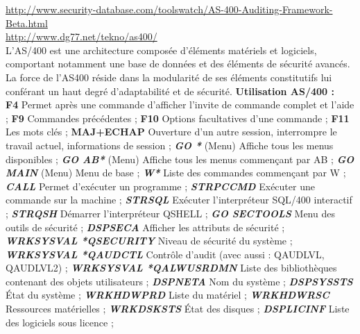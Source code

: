 \documentclass[a4paper,11pt]{article}				    %
\begin{document}
{
\url{http://www.security-database.com/toolswatch/AS-400-Auditing-Framework-Beta.html}\\
\url{http://www.dg77.net/tekno/as400/}
}
{
\\L'AS/400 est une architecture compos\'ee d'\'el\'ements mat\'eriels et logiciels, comportant notamment une base de donn\'ees et des \'el\'ements de s\'ecurit\'e avanc\'es. La force de l'AS400 r\'eside dans la modularit\'e de ses \'el\'ements constitutifs lui conf\'erant un haut degr\'e d'adaptabilit\'e et de s\'ecurit\'e.
}
{
\textbf{Utilisation AS/400 :}\\
{
\small
	\textbf{F4} Permet apr\`es une commande d'afficher l'invite de commande complet et l'aide ;\vskip-0.1cm
	\textbf{F9} Commandes pr\'ec\'edentes ;\vskip-0.1cm
	 \textbf{F10} Options facultatives d'une commande ;\vskip-0.1cm
	 \textbf{F11} Les mots cl\'es ;\vskip-0.1cm
	 \textbf{MAJ+ECHAP} Ouverture d'un autre session, interrompre le travail actuel, informations de session ;\vskip-0.1cm
	 \textbf{\sl \color{blue}GO *} (Menu) Affiche tous les menus disponibles ;\vskip-0.1cm
	 \textbf{\sl \color{blue}GO AB*} (Menu) Affiche tous les menus commen\c cant par AB ;\vskip-0.1cm
	 \textbf{\sl \color{blue}GO MAIN} (Menu) Menu de base ;\vskip-0.1cm
	 \textbf{\sl \color{blue}W*} Liste des commandes commen\c cant par W ;\vskip-0.1cm
	 \textbf{\sl \color{blue}CALL} Permet d'ex\'ecuter un programme ;\vskip-0.1cm
	 \textbf{\sl \color{blue}STRPCCMD} Ex\'ecuter une commande sur la machine ;\vskip-0.1cm
	 \textbf{\sl \color{blue}STRSQL} Ex\'ecuter l'interpr\'eteur SQL/400 interactif ;\vskip-0.1cm
	 \textbf{\sl \color{blue}STRQSH} D\'emarrer l'interpr\'eteur QSHELL ;\vskip-0.1cm
	 \textbf{\sl \color{blue}GO SECTOOLS} Menu des outils de s\'ecurit\'e ;\vskip-0.1cm
	 \textbf{\sl \color{blue}DSPSECA} Afficher les attributs de s\'ecurit\'e ;\vskip-0.1cm
	 \textbf{\sl \color{blue}WRKSYSVAL *QSECURITY} Niveau de s\'ecurit\'e du syst\`eme ;\vskip-0.1cm
	 \textbf{\sl \color{blue}WRKSYSVAL *QAUDCTL} Contr\^ole d'audit (avec aussi : QAUDLVL, QAUDLVL2) ;\vskip-0.1cm
	 \textbf{\sl \color{blue}WRKSYSVAL *QALWUSRDMN} Liste des biblioth\`eques contenant des objets utilisateurs ;\vskip-0.1cm
	 \textbf{\sl \color{blue}DSPNETA} Nom du syst\`eme ;\vskip-0.1cm
	 \textbf{\sl \color{blue}DSPSYSSTS} \'Etat du syst\`eme ;\vskip-0.1cm
	 \textbf{\sl \color{blue}WRKHDWPRD} Liste du mat\'eriel ;\vskip-0.1cm
	 \textbf{\sl \color{blue}WRKHDWRSC} Ressources mat\'erielles ;\vskip-0.1cm
	 \textbf{\sl \color{blue}WRKDSKSTS} \'Etat des disques ;\vskip-0.1cm
	 \textbf{\sl \color{blue}DSPLICINF} Liste des logiciels sous licence ;\vskip-0.1cm
}}
\end{document}

